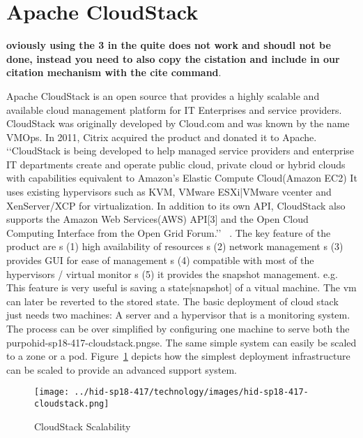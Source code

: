 
\section{Apache CloudStack}

{\bf oviously using the 3 in the quite does not work and shoudl not be
  done, instead you need to also copy the cistation and include in our
  citation mechanism with the cite command}.

Apache CloudStack is an open source that provides a highly scalable
and available cloud management platform for IT Enterprises and service
providers. CloudStack was originally developed by Cloud.com and was
known by the name VMOps.  In 2011, Citrix acquired the product and
donated it to Apache.
‘‘CloudStack is being developed to help managed service providers and
enterprise IT departments create and operate public cloud, private
cloud or hybrid clouds with capabilities equivalent to Amazon's
Elastic Compute Cloud(Amazon EC2) It uses existing hypervisors such
as KVM, VMware ESXi|VMware vcenter and XenServer/XCP for
virtualization. In addition to its own API, CloudStack also supports
the Amazon Web Services(AWS) API[3] and the Open Cloud Computing
Interface from the Open Grid Forum.’’ ~\cite{
  hid-sp18-417-wiki-cloudStack}.
The key feature of the product are 
s (1) high availability of resources
s (2) network management
s (3) provides GUI for ease of management
s (4) compatible with most of the hypervisors / virtual monitor
s (5) it provides the snapshot management. e.g. This feature is 
very useful is saving a state[snapshot] of a vitual machine. 
The vm can later be reverted to the stored state.  
The basic deployment of cloud stack just needs two machines: 
 A server and a hypervisor that is a monitoring system.  The process
can be over simplified by configuring one machine to serve both the
purpohid-sp18-417-cloudstack.pngse.
The same simple system can easily be scaled to a zone or a pod.
Figure~\ref{F:cloudstack-scalabuility} depicts how the simplest
deployment infrastructure can be scaled to provide an advanced support
system.
\begin{figure}[htb]
  \texttt{[image: ../hid-sp18-417/technology/images/hid-sp18-417-cloudstack.png]}
  \caption{CloudStack Scalability~\cite{hid-sp18-417-cloudstack-scaling}}
  \label{F:cloudstack-scalabuility}
\end{figure}

